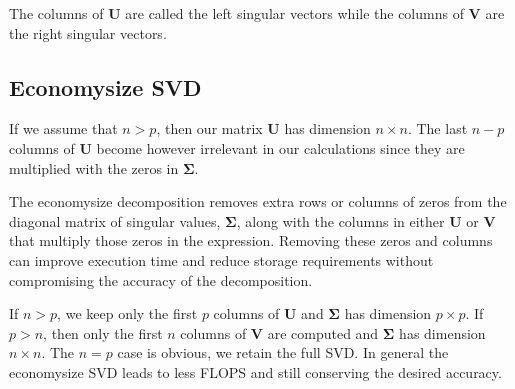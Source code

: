 \documentclass[letterpaper,10pt,english]{sphinxmanual}
\begin{document}
The columns of \(\boldsymbol{U}\) are called the left singular vectors while the columns of \(\boldsymbol{V}\) are the right singular vectors.


\subsection{Economy\sphinxhyphen{}size SVD}
\label{\detokenize{chapter4:economy-size-svd}}
If we assume that \(n > p\), then our matrix \(\boldsymbol{U}\) has dimension \(n
\times n\). The last \(n-p\) columns of \(\boldsymbol{U}\) become however
irrelevant in our calculations since they are multiplied with the
zeros in \(\boldsymbol{\Sigma}\).

The economy\sphinxhyphen{}size decomposition removes extra rows or columns of zeros
from the diagonal matrix of singular values, \(\boldsymbol{\Sigma}\), along with the columns
in either \(\boldsymbol{U}\) or \(\boldsymbol{V}\) that multiply those zeros in the expression.
Removing these zeros and columns can improve execution time
and reduce storage requirements without compromising the accuracy of
the decomposition.

If \(n > p\), we keep only the first \(p\) columns of \(\boldsymbol{U}\) and \(\boldsymbol{\Sigma}\) has dimension \(p\times p\).
If \(p > n\), then only the first \(n\) columns of \(\boldsymbol{V}\) are computed and \(\boldsymbol{\Sigma}\) has dimension \(n\times n\).
The \(n=p\) case is obvious, we retain the full SVD.
In general the economy\sphinxhyphen{}size SVD leads to less FLOPS and still conserving the desired accuracy.
\end{document}
